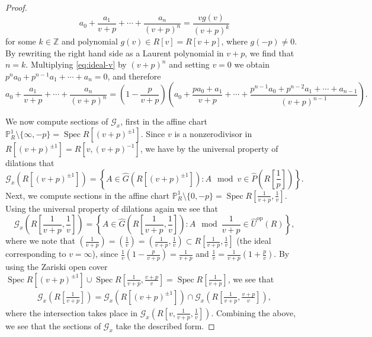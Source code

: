 \documentclass[10pt,a4paper]{amsart}
\begin{document}
\begin{proof}
    \begin{equation}
        \label{eq:ideal-v}
        a_{0} + \frac{a_{1}}{v+p} + \cdots + \frac{a_{n}}{(v+p)^n} = \frac{v g(v)}{(v+p)^k} 
    \end{equation}
    for some \(k \in \mathbb{Z}\) and polynomial \(g(v) \in R[v] = R[v+p]\), where \(g(-p) \neq 0\).
    By rewriting the right hand side as a Laurent polynomial in \(v+p\), we find that \(n = k\). 
    Multiplying \eqref{eq:ideal-v} by \((v+p)^n\) and setting \(v = 0\) we obtain \(p^n a_{0} + p^{n-1}a_{1} + \cdots + a_{n} = 0\), and therefore 
    \[a_{0} + \frac{a_{1}}{v+p} + \cdots + \frac{a_{n}}{(v+p)^n} = \left(1 - \frac{p}{v+p}\right) \left( a_{0} + \frac{pa_{0} + a_{1}}{v+p} + \cdots + \frac{p^{n-1}a_{0} + p^{n-2}a_{1} + \cdots + a_{n-1}}{(v+p)^{n-1}} \right).\]

    We now compute sections of \(\mathcal{G}_{x}\), first in the affine chart \(\mathbb{P}^1_{R} \setminus \lbrace \infty, -p \rbrace = \operatorname{Spec}R\left[ (v+p)^{\pm 1} \right]\). 
    Since \(v\) is a nonzerodivisor in \(R \left[(v+p)^{\pm 1} \right] = R\left[v, (v+p)^{-1} \right]\), we have by the universal property of dilations that 
    \[
        \mathcal{G}_{x}\left( R \left[(v+p)^{\pm 1} \right] \right) = \left\lbrace A \in \widehat{G}\left( R \left[ (v+p)^{\pm 1} \right] \right) : A \mod v \in \widehat{P}\left( R \left[ \frac{1}{p} \right] \right) \right\rbrace . 
    \]
    Next, we compute sections in the affine chart \(\mathbb{P}^1_{R} \setminus \lbrace 0, -p \rbrace = \operatorname{Spec} R\left[ \frac{1}{v+p}, \frac{1}{v} \right]\). 
    Using the universal property of dilations again we see that 
    \[
        \mathcal{G}_{x} \left( R \left[ \frac{1}{v+p}, \frac{1}{v} \right] \right) = \left\lbrace A \in \widehat{G} \left( R \left[ \frac{1}{v+p}, \frac{1}{v} \right] \right) : A \mod \frac{1}{v+p} \in \widehat{U}^\text{op}\left( R \right) \right\rbrace , 
    \]
    where we note that \(\left( \frac{1}{v+p} \right) = \left( \frac{1}{v} \right) = \left( \frac{1}{v+p},\frac{1}{v} \right) \subset R \left[ \frac{1}{v+p}, \frac{1}{v} \right]\) (the ideal corresponding to \(v = \infty\)), since \(\frac{1}{v}\left( 1 - \frac{p}{v+p}\right) = \frac{1}{v+p}\) and \(\frac{1}{v} = \frac{1}{v+p}\left( 1 + \frac{p}{v}\right)\).
    By using the Zariski open cover \(\operatorname{Spec} R \left[ (v+p)^{\pm 1} \right] \cup \operatorname{Spec} R \left[ \frac{1}{v+p}, \frac{v+p}{v} \right] = \operatorname{Spec}R \left[ \frac{1}{v+p}\right]\), 
    we see that 
    \begin{align*} 
        \mathcal{G}_{x} \left( R \left[ \frac{1}{v+p} \right] \right) = \mathcal{G}_{x} \left( R \left[(v+p)^{\pm 1} \right] \right) \cap \mathcal{G}_{x} \left( R \left[ \frac{1}{v+p}, \frac{v+p}{v} \right] \right) ,
    \end{align*}
    where the intersection takes place in \(\mathcal{G}_{x} \left( R\left[ v, \frac{1}{v+p}, \frac{1}{v} \right] \right)\).
    Combining the above, we see that the sections of \(\mathcal{G}_{x}\) take the described form. 
\end{proof}
\end{document}
